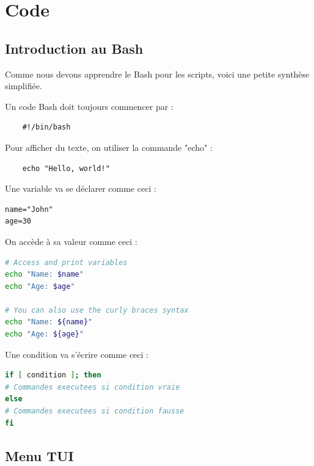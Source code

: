 \documentclass{article}
\begin{document}
	
	
	
	
	
	
	\section{Code}
	\subsection{Introduction au Bash}
	Comme nous devons apprendre le Bash pour les scripts, voici une petite synthèse simplifiée.
	
		Un code Bash doit toujours commencer par :
	\begin{lstlisting}
	#!/bin/bash
	\end{lstlisting}		
	
	Pour afficher du texte, on utiliser la commande "echo" :
	\begin{lstlisting}
	echo "Hello, world!"
	\end{lstlisting}		

	
	\begin{center}
		Une variable va se déclarer comme ceci :
	\end{center}
	\begin{lstlisting}
name="John"
age=30
	\end{lstlisting}

	\begin{center}
On accède à sa valeur comme ceci :
\end{center}

\begin{lstlisting}[language=bash, label={lst:bash-script}]
# Access and print variables
echo "Name: $name"
echo "Age: $age"

# You can also use the curly braces syntax
echo "Name: ${name}"
echo "Age: ${age}"
\end{lstlisting}

\begin{center}
	Une condition va s'écrire comme ceci :
\end{center}
	
\begin{lstlisting}[language=bash, label={lst:bash-script}]
if [ condition ]; then
# Commandes executees si condition vraie
else
# Commandes executees si condition fausse
fi

\end{lstlisting}
	
	\subsection{Menu TUI}
\end{document}
